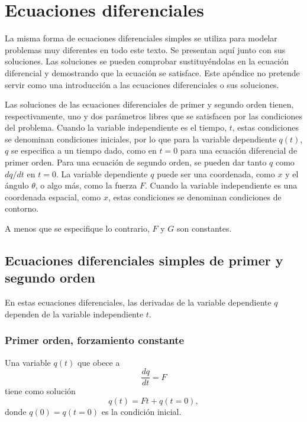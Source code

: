 \documentclass[12pt,a4paper]{book}
\begin{document}
\chapter{Ecuaciones diferenciales}\label{ch:appendixC}

La misma forma de ecuaciones diferenciales simples se utiliza para modelar problemas muy diferentes en todo este texto. Se presentan aquí junto con sus soluciones. Las soluciones se pueden comprobar sustituyéndolas en la ecuación diferencial y demostrando que la ecuación se satisface. Este apéndice no pretende servir como una introducción a las ecuaciones diferenciales o sus soluciones.

Las soluciones de las ecuaciones diferenciales de primer y segundo orden tienen, respectivamente, uno y dos parámetros libres que se satisfacen por las condiciones del problema. Cuando la variable independiente es el tiempo, $t$, estas condiciones se denominan condiciones iniciales, por lo que para la variable dependiente $q(t)$, $q$ se especifica a un tiempo dado, como en $t = 0$ para una ecuación diferencial de primer orden. Para una ecuación de segundo orden, se pueden dar tanto $q$ como $dq/dt$ en $t = 0$. La variable dependiente $q$ puede ser una coordenada, como $x$ y el ángulo $\theta$, o algo más, como la fuerza $F$. Cuando la variable independiente es una coordenada espacial, como $x$, estas condiciones se denominan condiciones de contorno.

A menos que se especifique lo contrario, $F$ y $G$ son constantes.

\section{Ecuaciones diferenciales simples de primer y segundo orden}\label{sec:C.1}

En estas ecuaciones diferenciales, las derivadas de la variable dependiente $q$ dependen de la variable independiente $t$.

\subsection*{Primer orden, forzamiento constante}

Una variable $q(t)$ que obece a
\begin{equation}
\frac{dq}{dt} = F
\label{eq:C.1}
\end{equation}
tiene como solución
\begin{equation}
q(t) = Ft + q(t = 0),
\label{eq:C.2}
\end{equation}
donde $q(0) = q(t = 0)$ es la condición inicial.
\end{document}

